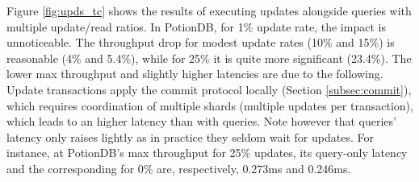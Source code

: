 \documentclass[sigplan,review,anonymous]{acmart}
\begin{document}

Figure \ref{fig:upds_tc} shows the results of executing updates alongside queries with multiple update/read ratios.
In PotionDB, for 1\% update rate, the impact is unnoticeable.
The throughput drop for modest update rates (10\% and 15\%) is reasonable (4\% and 5.4\%), while for 25\% it is quite more significant (23.4\%).
The lower max throughput and slightly higher latencies are due to the following.
Update transactions apply the commit protocol locally (Section \ref{subsec:commit}), which requires coordination of multiple shards (multiple updates per transaction), which leads to an higher latency than with queries.
Note however that queries' latency only raises lightly as in practice they seldom wait for updates.
For instance, at PotionDB's max throughput for 25\% updates, its query-only latency and the corresponding for 0\% are, respectively, 0.273ms and 0.246ms.

\end{document}
